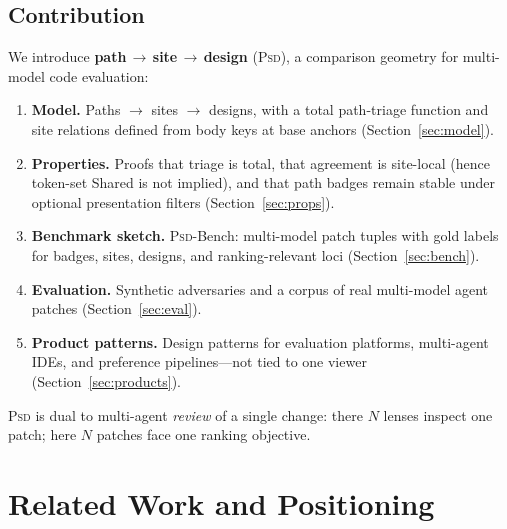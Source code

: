 \documentclass[
  11pt,
  a4paper,
  oneside,
  numbers=noenddot,
  abstract=true,
  headings=normal,
  DIV=11,
  BCOR=0mm,
]{scrartcl}
\theoremstyle{definition}
\theoremstyle{plain}
\theoremstyle{remark}
\newcommand{\PathSiteDesign}{\textbf{path\,$\rightarrow$\,site\,$\rightarrow$\,design}}
\newcommand{\PSD}{\textsc{Psd}}
\begin{document}
\subsection{Contribution}

We introduce \PathSiteDesign{} (\PSD{}), a comparison geometry for
multi-model code evaluation:

\begin{enumerate}
  \item \textbf{Model.} Paths $\rightarrow$ sites $\rightarrow$ designs,
        with a total path-triage function and site relations defined from
        body keys at base anchors (Section~\ref{sec:model}).
  \item \textbf{Properties.} Proofs that triage is total, that agreement
        is site-local (hence token-set Shared is not implied), and that
        path badges remain stable under optional presentation filters
        (Section~\ref{sec:props}).
  \item \textbf{Benchmark sketch.} \PSD{}-Bench: multi-model patch tuples
        with gold labels for badges, sites, designs, and ranking-relevant
        loci (Section~\ref{sec:bench}).
  \item \textbf{Evaluation.} Synthetic adversaries and a corpus of real
        multi-model agent patches (Section~\ref{sec:eval}).
  \item \textbf{Product patterns.} Design patterns for evaluation
        platforms, multi-agent IDEs, and preference pipelines---not tied
        to one viewer (Section~\ref{sec:products}).
\end{enumerate}

\PSD{} is dual to multi-agent \emph{review} of a single change: there $N$
lenses inspect one patch; here $N$ patches face one ranking objective.

\section{Related Work and Positioning}
\label{sec:related}
\end{document}
